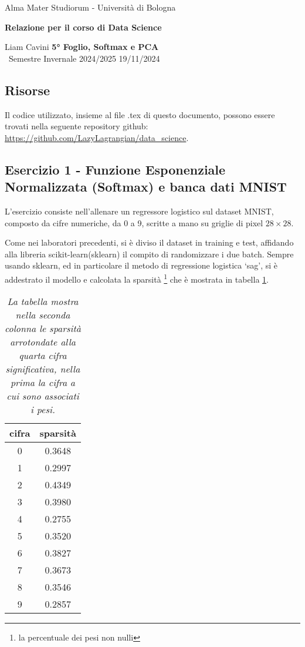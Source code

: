 \documentclass{article}
\begin{document}
\begin{center}
    {\Large Alma Mater Studiorum - Università di Bologna}
    
    \vspace{0.5cm}
    {\bf \large Relazione per il corso di Data Science}
\end{center} 

\noindent
{ Liam Cavini} \hfill {\bf 5° Foglio, Softmax e PCA}\\
{\ Semestre Invernale 2024/2025} \hfill 19/11/2024

\subsection*{Risorse}
Il codice utilizzato, insieme al file .tex di questo documento, possono essere trovati nella seguente repository github: \url{https://github.com/LazyLagrangian/data_science}.

\subsection*{Esercizio 1 - Funzione Esponenziale Normalizzata (Softmax) e banca dati MNIST}
L'esercizio consiste nell'allenare un regressore logistico sul dataset MNIST, composto da cifre numeriche, da 0 a 9, scritte a mano su griglie di pixel $28 \times 28$.

Come nei laboratori precedenti, si è diviso il dataset in training e test, affidando alla libreria scikit-learn(sklearn) il compito di randomizzare i due batch. Sempre usando sklearn, ed in particolare il metodo di regressione logistica `sag', si è addestrato il modello e calcolata la sparsità \footnote{la percentuale dei pesi non nulli} che è mostrata in tabella \ref{tab:sparsità}.

\begin{table}[h]
    \centering
\begin{tabular}[]{|c|c|}
    \hline
    cifra & sparsità\\ \hline
    0 & 0.3648 \\ \hline
    1 & 0.2997 \\ \hline
    2 & 0.4349 \\ \hline
    3 & 0.3980 \\ \hline
    4 & 0.2755 \\ \hline
    5 & 0.3520 \\ \hline
    6 & 0.3827 \\ \hline
    7 & 0.3673 \\ \hline
    8 & 0.3546 \\ \hline
    9 & 0.2857 \\ \hline
\end{tabular}
\caption{\emph{La tabella mostra nella seconda colonna le sparsità arrotondate alla quarta cifra significativa, nella prima la cifra a cui sono associati i pesi.}}
\label{tab:sparsità}
\end{table}
\end{document}
